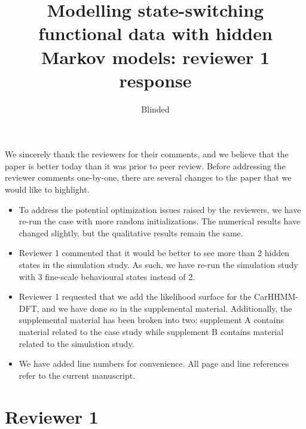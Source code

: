 \documentclass{article}
\begin{document}
\title{Modelling state-switching functional data with hidden Markov models: reviewer 1 response}
\date{}
\author{Blinded}

\maketitle

We sincerely thank the reviewers for their comments, and we believe that the paper is better today than it was prior to peer review. Before addressing the reviewer comments one-by-one, there are several changes to the paper that we would like to highlight.

\begin{itemize}
    \item To address the potential optimization issues raised by the reviewers, we have re-run the case with more random initializations. The numerical results have changed slightly, but the qualitative results remain the same.
    \item Reviewer 1 commented that it would be better to see more than 2 hidden states in the simulation study. As such, we have re-run the simulation study with 3 fine-scale behavioural states instead of 2.
    \item Reviewer 1 requested that we add the likelihood surface for the CarHHMM-DFT, and we have done so in the supplemental material. Additionally, the supplemental material has been broken into two: supplement A contains material related to the case study while supplement B contains material related to the simulation study. 
    \item We have added line numbers for convenience. All page and line references refer to the current manuscript.
\end{itemize}


\section{Reviewer 1}
\end{document}
